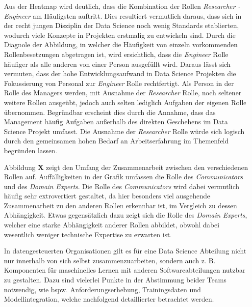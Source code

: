 Aus der Heatmap wird deutlich, dass die Kombination der Rollen \textit{Researcher - Engineer} am Häufigsten auftritt.
Dies resultiert vermutlich daraus, dass sich in der recht jungen Disziplin der Data Science noch wenig Standards etablierten, wodurch viele Konzepte in Projekten erstmalig zu entwickeln sind.
Durch die Diagnole der Abbildung, in welcher die Häufigkeit von einzeln vorkommenden Rollenbesetzungen abgetragen ist, wird ersichtlich, dass die \textit{Engineer} Rolle häufiger als alle anderen von einer Person ausgefüllt wird.
Daraus lässt sich vermuten, dass der hohe Entwicklungsaufwand in Data Science Projekten die Fokussierung von Personal zur \textit{Engineer} Rolle rechtfertigt.
Als Person in der Rolle des Managers werden, mit Ausnahme der \textit{Researcher} Rolle, noch seltener weitere Rollen ausgeübt, jedoch auch selten lediglich Aufgaben der eigenen Rolle übernommen.
Begründbar erscheint dies durch die Annahme, dass das Management häufig Aufgaben außerhalb des direkten Geschehens im Data Science Projekt umfasst.
Die Ausnahme der \textit{Researcher} Rolle würde sich logisch durch den gemeinsamen hohen Bedarf an Arbeitserfahrung im Themenfeld begründen lassen.

Abbildung \textbf{X} zeigt den Umfang der Zusammenarbeit zwischen den verschiedenen Rollen auf.
Auffälligkeiten in der Grafik umfassen die Rolle des \textit{Communicators} und des \textit{Domain Experts}.
Die Rolle des \textit{Communicators} wird dabei vermutlich häufig sehr extrovertiert gestaltet, da hier besonders viel ausgehende Zusammenarbeit zu den anderen Rollen erkennbar ist, im Vergleich zu dessen Abhängigkeit.
Etwas gegensätzlich dazu zeigt sich die Rolle des \textit{Domain Experts}, welcher eine starke Abhängigkeit anderer Rollen abbildet, obwohl dabei wesentlich weniger technische Expertise zu erwarten ist.

In datengesteuerten Organisationen gilt es für eine Data Science Abteilung nicht nur innerhalb von sich selbst zusammenzuarbeiten, sondern auch z. B. Komponenten für maschinelles Lernen mit anderen Softwareabteilungen nutzbar zu gestalten.
Dazu sind vielerlei Punkte in der Abstimmung beider Teams notwendig, wie bspw. Anforderungserhebung, Trainingsdaten und Modellintegration, welche nachfolgend detaillierter betrachtet werden.
